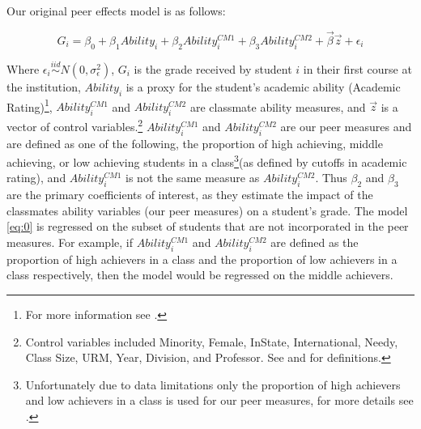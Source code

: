 Our original peer effects model is as follows:
\setlength{\belowdisplayskip}{6pt} \setlength{\belowdisplayshortskip}{1pt}
\setlength{\abovedisplayskip}{-4pt} \setlength{\abovedisplayshortskip}{1pt}

\begin{equation}\label{eq:0}
G_{i} = \beta_{0} + \beta_{1} Ability_{i} + \beta_{2} Ability_{i}^{CM1} + \beta_{3} Ability_{i}^{CM2} + \overrightarrow{\beta} \overrightarrow{z} + \epsilon_{i}
\end{equation}

Where $\epsilon_{i} \stackrel{iid}{\sim} N(0,\sigma_{\epsilon}^2)$, $G_{i}$ is the grade received by student $i$ in their first course at the institution, $Ability_{i}$ is a proxy for the student's academic ability (Academic Rating)\footnote{For more information see .}, $Ability_{i}^{CM1}$ and $Ability_{i}^{CM2}$ are classmate ability measures, and $\overrightarrow{z}$ is a vector of control variables.\footnote{Control variables included Minority, Female, InState, International, Needy, Class Size, URM, Year, Division, and Professor. See  and  for definitions.}
$Ability_{i}^{CM1}$ and $Ability_{i}^{CM2}$ are our peer measures and are defined as one of the following, the proportion of high achieving, middle achieving, or low achieving students in a class\footnote{Unfortunately due to data limitations only the proportion of high achievers and low achievers in a class is used for our peer measures, for more details see .}(as defined by cutoffs in academic rating), and $Ability_{i}^{CM1}$ is not the same measure as  $Ability_{i}^{CM2}$. 
Thus $\beta_{2}$ and $\beta_{3}$ are the primary coefficients of interest, as they estimate the impact of the classmates ability variables (our peer measures) on a student's grade. 
The model \eqref{eq:0} is regressed on the subset of students that are not incorporated in the peer measures. 
For example, if $Ability_{i}^{CM1}$ and $Ability_{i}^{CM2}$ are defined as the proportion of high achievers in a class and the proportion of low achievers in a class respectively, then the model would be regressed on the middle achievers. 

